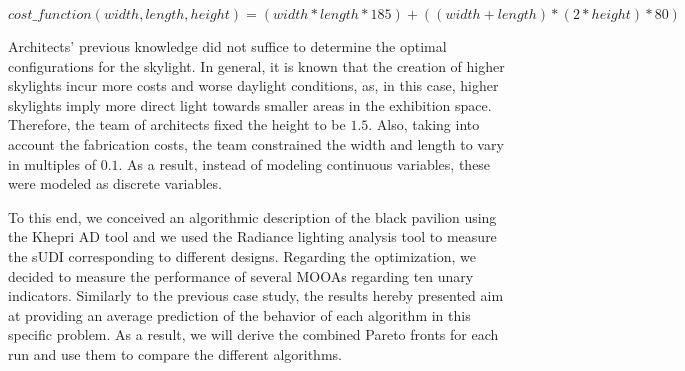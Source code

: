 \begin{equation} \label{eq:costanalysis}
cost\_function(width, length, height) = (width * length * 185) + ((width + length) * ( 2 * height) * 80)
\end{equation}

Architects' previous knowledge did not suffice to determine the optimal configurations for the skylight. In general, it is known that the creation of higher skylights incur more costs and worse daylight conditions, as, in this case, higher skylights imply more direct light towards smaller areas in the exhibition space. Therefore, the team of architects fixed the height to be $1.5$\metre. Also, taking into account the fabrication costs, the team constrained the width and length to vary in multiples of $0.1$\metre. As a result, instead of modeling continuous variables, these were modeled as discrete variables.

To this end, we conceived an algorithmic description of the black pavilion using the Khepri \ac{AD} tool and we used the Radiance lighting analysis tool to measure the \ac{sUDI} corresponding to different designs. Regarding the optimization, we decided to measure the performance of several \acp{MOOA} regarding ten unary indicators. Similarly to the previous case study, the results hereby presented aim at providing an average prediction of the behavior of each algorithm in this specific problem. As a result, we will derive the combined Pareto fronts for each run and use them to compare the different algorithms.




